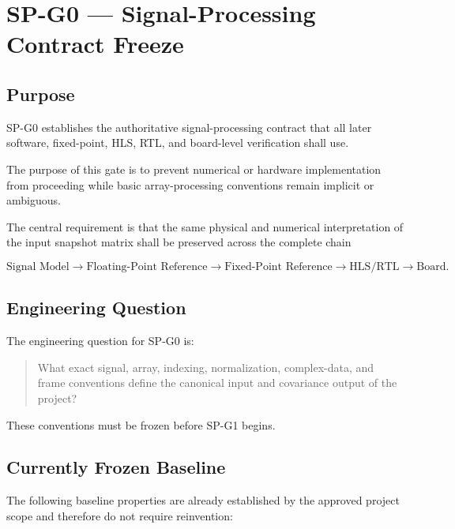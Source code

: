 \section{SP-G0 --- Signal-Processing Contract Freeze}
\label{sec:sp-g0}

\subsection{Purpose}

SP-G0 establishes the authoritative signal-processing contract that all later
software, fixed-point, HLS, RTL, and board-level verification shall use.

The purpose of this gate is to prevent numerical or hardware implementation
from proceeding while basic array-processing conventions remain implicit or
ambiguous.

The central requirement is that the same physical and numerical interpretation
of the input snapshot matrix shall be preserved across the complete chain

\[
\text{Signal Model}
\rightarrow
\text{Floating-Point Reference}
\rightarrow
\text{Fixed-Point Reference}
\rightarrow
\text{HLS/RTL}
\rightarrow
\text{Board}.
\]

\subsection{Engineering Question}

The engineering question for SP-G0 is:

\begin{quote}
What exact signal, array, indexing, normalization, complex-data, and frame
conventions define the canonical input and covariance output of the project?
\end{quote}

These conventions must be frozen before SP-G1 begins.

\subsection{Currently Frozen Baseline}

The following baseline properties are already established by the approved
project scope and therefore do not require reinvention:

